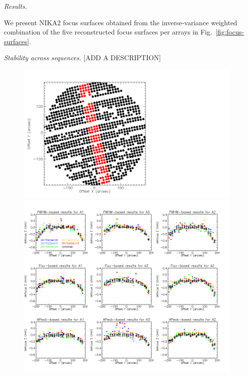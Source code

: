 \emph{Results. }

We present NIKA2 focus surfaces obtained from the inverse-variance
weighted combination of the five reconstructed focus surfaces per
arrays in Fig.~\ref{fig:focus-surfaces}.


\emph{Stability across sequences. }
[ADD A DESCRIPTION]

\begin{figure}
  \includegraphics[trim={-2cm, 2cm, 0, 2cm}, clip, angle=0, scale=0.1]{Figures/fov_focus_stability_check_D1.png}
  \begin{center}
  \includegraphics[trim={0, 2cm, 0, 2cm}, clip, angle=0, scale=0.5]{Figures/fov_focus_1D_Vband_5.png}
  \end{center}
\caption{}
\label{fig:focus-stability-H}
\end{figure}


